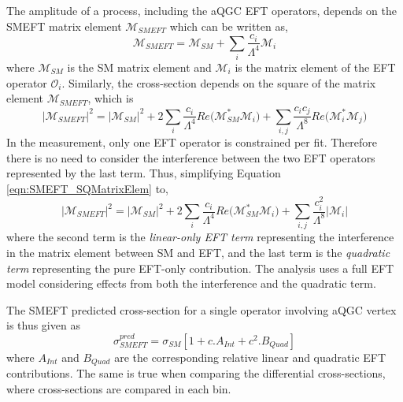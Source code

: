 The amplitude of a process, including the aQGC EFT operators, depends on the SMEFT matrix element $\mathcal{M}_{SMEFT}$ which can be written as, 
\begin{equation}
    \mathcal{M}_{SMEFT} = \mathcal{M}_{SM} + \sum_{i}{ \frac{c_{i}}{\Lambda^4}\mathcal{M}_{i}}
    \label{eqn:SMEFTMatrixElem}
\end{equation}
where $\mathcal{M}_{SM}$ is the SM matrix element and $\mathcal{M}_{i}$ is the matrix element of the EFT operator $\mathcal{O}_{i}$. Similarly, the cross-section depends on the square of the matrix element $\mathcal{M}_{SMEFT}$, which is 
\begin{equation}
    |\mathcal{M}_{SMEFT}|^2 = |\mathcal{M}_{SM}|^{2} + 2 \sum_{i}{ \frac{c_{i}}{\Lambda^4} \textit{Re}(\mathcal{M}_{SM}^{*} \mathcal{M}_{i}}) + \sum_{i,j}{ \frac{c_{i}c_{j}}{\Lambda^8} \textit{Re}(\mathcal{M}_{i}^{*} \mathcal{M}_{j}})
    \label{eqn:SMEFT_SQMatrixElem}
\end{equation}
In the measurement, only one EFT operator is constrained per fit. Therefore there is no need to consider the interference between the two EFT operators represented by the last term. Thus, simplifying Equation \ref{eqn:SMEFT_SQMatrixElem} to, 
\begin{equation}
    |\mathcal{M}_{SMEFT}|^2 = |\mathcal{M}_{SM}|^{2} + 2 \sum_{i}{ \frac{c_{i}}{\Lambda^4} \textit{Re}(\mathcal{M}_{SM}^{*} \mathcal{M}_{i}}) + \sum_{i,j}{ \frac{c_{i}^2}{\Lambda^8} |\mathcal{M}_{i}|}
    \label{eqn:SMEFT_CrossSec}
\end{equation}
where the second term is the \textit{linear-only EFT term} representing the interference in the matrix element between SM and EFT, and the last term is the \textit{quadratic term} representing the pure EFT-only contribution. The analysis uses a full EFT model considering effects from both the interference and the quadratic term. 

The SMEFT predicted cross-section for a single operator involving aQGC vertex is thus given as 
\begin{equation}
\sigma_{SMEFT}^{pred} = \sigma_{SM}[ 1 + c . A_{Int} + c^2 . B_{Quad} ]
\end{equation}
where $A_{Int}$ and $B_{Quad}$ are the corresponding relative linear and quadratic EFT contributions. The same is true when comparing the differential cross-sections, where cross-sections are compared in each bin. 

